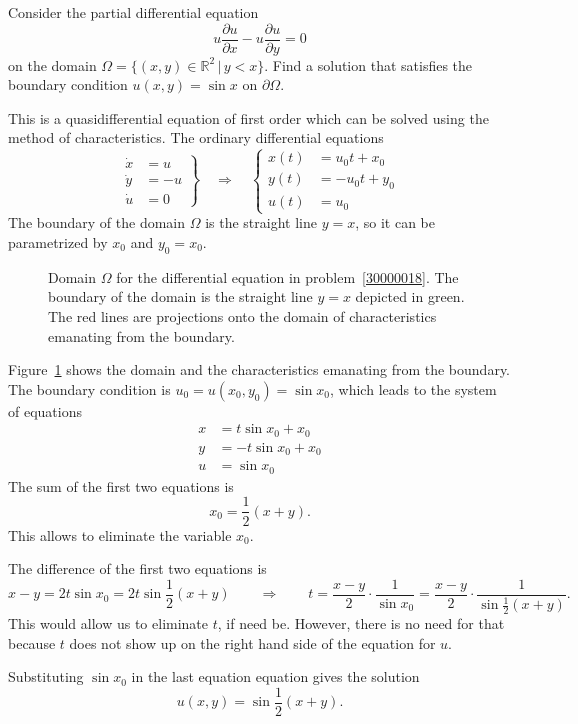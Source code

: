 Consider the partial differential equation
\[
u\frac{\partial u}{\partial x}
-
u\frac{\partial u}{\partial y}
=
0
\]
on the domain
$\Omega = \{(x,y)\in\mathbb R^2 \,|\, y < x\}$.
Find a solution that satisfies the boundary condition $u(x,y) = \sin x$ on
$\partial\Omega$.

\begin{loesung}
This is a quasidifferential equation of first order which can be solved
using the method of characteristics.
The ordinary differential equations
\[
\left.
\begin{aligned}
\dot{x}&=u\\
\dot{y}&=-u\\
\dot{u}&=0
\end{aligned}
\right\}
\quad\Rightarrow\quad
\left\{
\begin{aligned}
x(t)&=u_0t+x_0\\
y(t)&=-u_0t+y_0\\
u(t)&=u_0
\end{aligned}
\right.
\]
The boundary of the domain $\Omega$ is the straight line $y=x$, so it
can be parametrized by $x_0$ and $y_0=x_0$.
\begin{figure}
\centering
{}
\caption{Domain $\Omega$ for the differential equation in
problem~\ref{30000018}.
The boundary of the domain is the straight line $y=x$ depicted in green.
The red lines are projections onto the domain of characteristics
emanating from the boundary.
\label{30000018:domain}}
\end{figure}
Figure~\ref{30000018:domain} shows the domain and the characteristics
emanating from the boundary.
The boundary condition is $u_0=u(x_0,y_0)=\sin x_0$, which leads to 
the system of equations
\begin{align*}
x &= t \sin x_0 + x_0\\
y &= -t \sin x_0 + x_0\\
u &= \sin x_0
\end{align*}
The sum of the first two equations is
\[
x_0 = \frac12(x+y).
\]
This allows to eliminate the variable $x_0$.

The difference of the first two equations is
\[
x-y=2t\sin x_0 = 2t\sin{\textstyle\frac12}(x+y)
\qquad\Rightarrow\qquad
t
=
\frac{x-y}2\cdot\frac1{\sin x_0}
=
\frac{x-y}2 \cdot\frac1{\sin\frac12(x+y)}.
\]
This would allow us to eliminate $t$, if need be.
However, there is no need for that because $t$
does not show up on the right hand side of the equation for $u$.

Substituting $\sin x_0$ in the last equation equation gives the solution
\[
u(x,y) = \sin{\textstyle\frac12}(x+y).
\]


\end{loesung}
